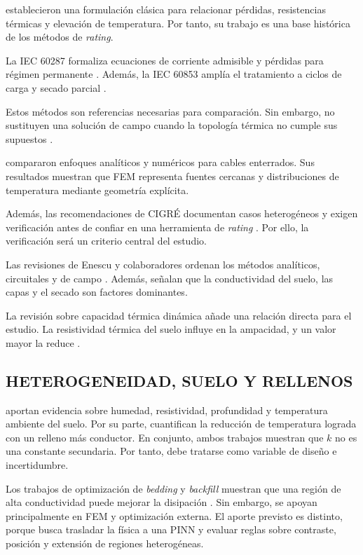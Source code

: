 \documentclass[11pt,a4paper,oneside]{report}
\begin{document}
\textcite[752--772]{neher1957} establecieron una formulación clásica para relacionar pérdidas, resistencias térmicas y elevación de temperatura. Por tanto, su trabajo es una base histórica de los métodos de \textit{rating}.

La IEC 60287 formaliza ecuaciones de corriente admisible y pérdidas para régimen permanente \parencite[cláusulas 4--5]{iec60287}. Además, la IEC 60853 amplía el tratamiento a ciclos de carga y secado parcial \parencite[cláusulas 2--4]{iec60853}.

Estos métodos son referencias necesarias para comparación. Sin embargo, no sustituyen una solución de campo cuando la topología térmica no cumple sus supuestos \parencites{iec60287}{iec60853}[3--4,93--99]{cigre2025}.

\textcite[1387--1400]{aras2005} compararon enfoques analíticos y numéricos para cables enterrados. Sus resultados muestran que FEM representa fuentes cercanas y distribuciones de temperatura mediante geometría explícita.

Además, las recomendaciones de CIGRÉ documentan casos heterogéneos y exigen verificación antes de confiar en una herramienta de \textit{rating} \parencite[3--4,41--42,93--99]{cigre2025}. Por ello, la verificación será un criterio central del estudio.

Las revisiones de Enescu y colaboradores ordenan los métodos analíticos, circuitales y de campo \parencite[4,11,17]{enescu2020}. Además, señalan que la conductividad del suelo, las capas y el secado son factores dominantes.

La revisión sobre capacidad térmica dinámica añade una relación directa para el estudio. La resistividad térmica del suelo influye en la ampacidad, y un valor mayor la reduce \parencite[3--6]{enescu2021}.

\subsection{HETEROGENEIDAD, SUELO Y RELLENOS}

\textcite[1,6--9]{khumalo2025} aportan evidencia sobre humedad, resistividad, profundidad y temperatura ambiente del suelo. Por su parte, \textcite[1,10,16]{kim2025} cuantifican la reducción de temperatura lograda con un relleno más conductor. En conjunto, ambos trabajos muestran que $k$ no es una constante secundaria. Por tanto, debe tratarse como variable de diseño e incertidumbre.

Los trabajos de optimización de \textit{bedding} y \textit{backfill} muestran que una región de alta conductividad puede mejorar la disipación \parencites[1--3]{oclon2015}[1--4]{atoccsa2024}. Sin embargo, se apoyan principalmente en FEM y optimización externa. El aporte previsto es distinto, porque busca trasladar la física a una PINN y evaluar reglas sobre contraste, posición y extensión de regiones heterogéneas.
\end{document}

